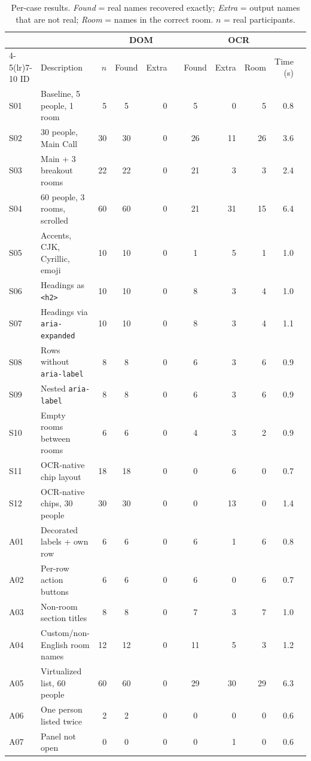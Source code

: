 \begin{table}[t]
\caption{Per-case results. \emph{Found} = real names recovered exactly; \emph{Extra} = output names that are not real; \emph{Room} = names in the correct room. $n$ = real participants.}
\label{tab:cases}
\centering\footnotesize
\begin{tabular}{llrcrrcrrrr}
\toprule
 & & & \multicolumn{2}{c}{DOM} & & \multicolumn{4}{c}{OCR} & \\
\cmidrule(lr){4-5}\cmidrule(lr){7-10}
ID & Description & $n$ & Found & Extra & & Found & Extra & Room & Time (s) \\
\midrule
S01 & Baseline, 5 people, 1 room & 5 & 5 & 0 & & 5 & 0 & 5 & 0.8 \\
S02 & 30 people, Main Call & 30 & 30 & 0 & & 26 & 11 & 26 & 3.6 \\
S03 & Main + 3 breakout rooms & 22 & 22 & 0 & & 21 & 3 & 3 & 2.4 \\
S04 & 60 people, 3 rooms, scrolled & 60 & 60 & 0 & & 21 & 31 & 15 & 6.4 \\
S05 & Accents, CJK, Cyrillic, emoji & 10 & 10 & 0 & & 1 & 5 & 1 & 1.0 \\
S06 & Headings as \texttt{<h2>} & 10 & 10 & 0 & & 8 & 3 & 4 & 1.0 \\
S07 & Headings via \texttt{aria-expanded} & 10 & 10 & 0 & & 8 & 3 & 4 & 1.1 \\
S08 & Rows without \texttt{aria-label} & 8 & 8 & 0 & & 6 & 3 & 6 & 0.9 \\
S09 & Nested \texttt{aria-label} & 8 & 8 & 0 & & 6 & 3 & 6 & 0.9 \\
S10 & Empty rooms between rooms & 6 & 6 & 0 & & 4 & 3 & 2 & 0.9 \\
S11 & OCR-native chip layout & 18 & 18 & 0 & & 0 & 6 & 0 & 0.7 \\
S12 & OCR-native chips, 30 people & 30 & 30 & 0 & & 0 & 13 & 0 & 1.4 \\
\midrule
A01 & Decorated labels + own row & 6 & 6 & 0 & & 6 & 1 & 6 & 0.8 \\
A02 & Per-row action buttons & 6 & 6 & 0 & & 6 & 0 & 6 & 0.7 \\
A03 & Non-room section titles & 8 & 8 & 0 & & 7 & 3 & 7 & 1.0 \\
A04 & Custom/non-English room names & 12 & 12 & 0 & & 11 & 5 & 3 & 1.2 \\
A05 & Virtualized list, 60 people & 60 & 60 & 0 & & 29 & 30 & 29 & 6.3 \\
A06 & One person listed twice & 2 & 2 & 0 & & 0 & 0 & 0 & 0.6 \\
A07 & Panel not open & 0 & 0 & 0 & & 0 & 1 & 0 & 0.6 \\
\bottomrule
\end{tabular}
\end{table}

